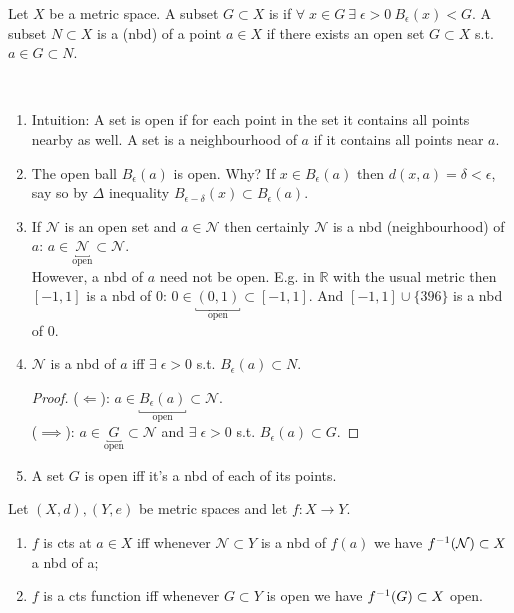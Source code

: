 \begin{definition}
    Let $X$ be a metric space.
    A subset $G \subset X$ is  if $\forall \; x \in G \ \exists \; \epsilon > 0 \ B_\epsilon(x) < G$.
    A subset $N \subset X$ is a  (nbd) of a point $a \in X$ if there exists an open set $G \subset X$ s.t. $a \in G \subset N$.
\end{definition} 

\begin{remark} \
    \begin{enumerate}
        \item \color{blue} Intuition: \color{black} A set is open if for each point in the set it contains all points nearby as well.
        A set is a neighbourhood of $a$ if it contains all points near $a$.
        \item The open ball $B_\epsilon(a)$ is open.
        Why?
        If $x \in B_\epsilon(a)$ then $d(x, a) = \delta < \epsilon$, say so by $\Delta$ inequality $B_{\epsilon - \delta}(x) \subset B_\epsilon(a)$.
        \item If $\mathcal{N}$ is an open set and $a \in \mathcal{N}$ then certainly $\mathcal{N}$ is a nbd (neighbourhood) of $a$: $a \in \underbracket{\mathcal{N}}_\text{open} \subset \mathcal{N}$. \\
        However, a nbd of $a$ need not be open.
        E.g. in $\mathbb{R}$ with the usual metric then $[-1, 1]$ is a nbd of $0$: $0 \in \underbracket{(0, 1)}_\text{open} \subset [-1, 1]$.
        And $[-1, 1] \cup \{396\}$ is a nbd of $0$.
        \item $\mathcal{N}$ is a nbd of $a$ iff $\exists \; \epsilon > 0$ s.t. $B_\epsilon(a) \subset N$.
        \begin{proof}
            ($\Longleftarrow$): $a \in \underbracket{B_\epsilon(a)}_\text{open} \subset \mathcal{N}$. \\
            ($\implies$): $a \in \underbracket{G}_\text{open} \subset \mathcal{N}$ and $\exists \; \epsilon > 0$ s.t. $B_\epsilon(a) \subset G$.
        \end{proof} 
        \item A set $G$ is open iff it's a nbd of each of its points.
    \end{enumerate} 
\end{remark} 

\begin{proposition} \label{prp:23}
    Let $(X, d), (Y, e)$ be metric spaces and let $f : X \to Y$.
    \begin{enumerate}
        \item $f$ is cts at $a \in X$ iff whenever $\mathcal{N} \subset Y$ is a nbd of $f(a)$ we have $f^{-1}(\mathcal{N}) \subset X$ a nbd of a;
        \item $f$ is a cts function iff whenever $G \subset Y$ is open we have $f^{-1}(G) \subset X$ open.
    \end{enumerate} 
\end{proposition} 

